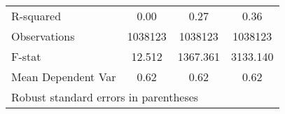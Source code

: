 {\begin{tabular}{l*{3}{c}}
\hline
R-squared           &        0.00         &        0.27         &        0.36         \\
Observations        &     1038123         &     1038123         &     1038123         \\
F-stat              &      12.512         &    1367.361         &    3133.140         \\
Mean Dependent Var  &        0.62         &        0.62         &        0.62         \\
\hline\hline
\multicolumn{4}{l}{\footnotesize Robust standard errors in parentheses}\\
\end{tabular}
}
